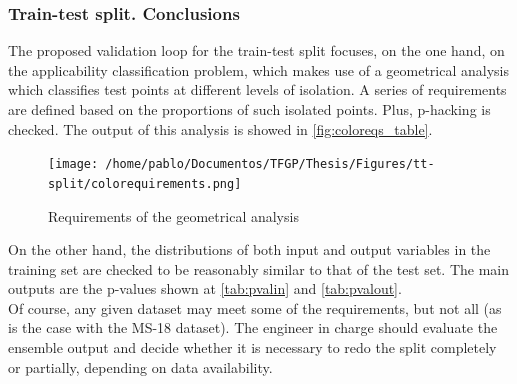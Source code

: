 \subsubsection{Train-test split. Conclusions}
\indent The proposed validation loop for the train-test split focuses, on the one hand, on the applicability classification problem, which makes use of a geometrical analysis which classifies test points at different levels of isolation. A series of requirements are defined based on the proportions of such isolated points. Plus, p-hacking is checked. The output of this analysis is showed in \autoref{fig:coloreqs_table}.\\
%
\begin{figure}[!htb]
	\centering
	\texttt{[image: /home/pablo/Documentos/TFGP/Thesis/Figures/tt-split/colorequirements.png]}
	\caption{Requirements of the geometrical analysis}
	\label{fig:coloreqs_table}
\end{figure}
\indent On the other hand, the distributions of both input and output variables in the training set are checked to be reasonably similar to that of the test set. The main outputs are the p-values shown at \autoref{tab:pvalin} and \autoref{tab:pvalout}.\\
%
\indent Of course, any given dataset may meet some of the requirements, but not all (as is the case with the MS-18 dataset). The engineer in charge should evaluate the ensemble output and decide whether it is necessary to redo the split completely or partially, depending on data availability.\\
%
\clearpage

